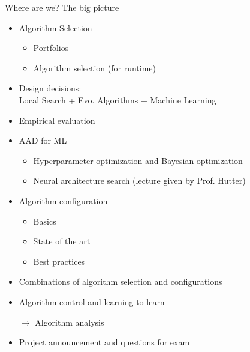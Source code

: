 \begin{frame}[c]{Where are we? The big picture}

\begin{itemize}
\item Algorithm Selection
  \begin{itemize}
    \item Portfolios
    \item Algorithm selection (for runtime)
  \end{itemize}
  \item Design decisions:\\ Local Search + Evo. Algorithms + Machine Learning 
  \item Empirical evaluation
  \item AAD for ML
  \begin{itemize}
    \item Hyperparameter optimization and Bayesian optimization 
    \item Neural architecture search (lecture given by Prof. Hutter)
  \end{itemize}
  \item Algorithm configuration 
  \begin{itemize}
    \item Basics 
    \item State of the art 
    \item Best practices 
  \end{itemize}
  \item Combinations of algorithm selection and configurations
  \item Algorithm control and learning to learn
  \item[$\to$] Algorithm analysis 
  \item Project announcement and questions for exam 
\end{itemize}

\end{frame}
